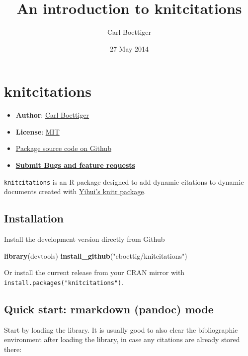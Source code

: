 \documentclass[]{article}
\title{An introduction to knitcitations}
\author{Carl Boettiger}
\date{27 May 2014}
\newenvironment{Shaded}{\begin{snugshade}}{\end{snugshade}}
\newcommand{\KeywordTok}[1]{\textcolor[rgb]{0.13,0.29,0.53}{\textbf{{#1}}}}
\newcommand{\StringTok}[1]{\textcolor[rgb]{0.31,0.60,0.02}{{#1}}}
\newcommand{\NormalTok}[1]{{#1}}
\providecommand{\tightlist}{%
  \setlength{\itemsep}{0pt}\setlength{\parskip}{0pt}}
\begin{document}
\maketitle

{
\hypersetup{linkcolor=black}
\setcounter{tocdepth}{2}
\tableofcontents
}
\section{knitcitations}\label{knitcitations}

\begin{itemize}
\tightlist
\item
  \textbf{Author}: \href{http://www.carlboettiger.info/}{Carl Boettiger}
\item
  \textbf{License}: \href{http://opensource.org/licenses/MIT}{MIT}
\item
  \href{https://github.com/cboettig/knitcitations}{Package source code
  on Github}
\item
  \href{https://github.com/cboettig/knitcitations/issues}{\textbf{Submit
  Bugs and feature requests}}
\end{itemize}

\texttt{knitcitations} is an R package designed to add dynamic citations
to dynamic documents created with
\href{https://github.com/yihui/knitr}{Yihui's knitr package}.

\subsection{Installation}\label{installation}

Install the development version directly from Github

\begin{Shaded}
\begin{Highlighting}[]
\KeywordTok{library}\NormalTok{(devtools)}
\KeywordTok{install_github}\NormalTok{(}\StringTok{"cboettig/knitcitations"}\NormalTok{)}
\end{Highlighting}
\end{Shaded}

Or install the current release from your CRAN mirror with
\texttt{install.packages("knitcitations")}.

\subsection{Quick start: rmarkdown (pandoc)
mode}\label{quick-start-rmarkdown-pandoc-mode}

Start by loading the library. It is usually good to also clear the
bibliographic environment after loading the library, in case any
citations are already stored there:
\end{document}
